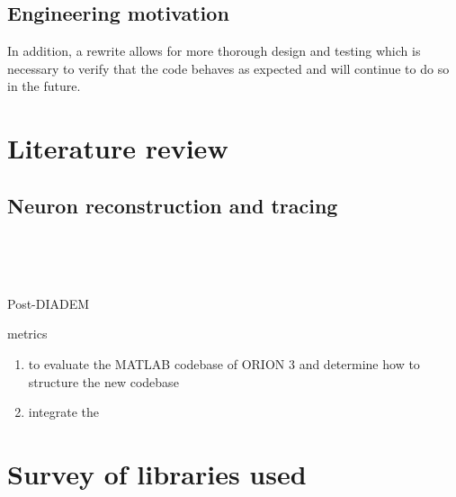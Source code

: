 \subsection{Engineering motivation}

In addition, a rewrite allows for more thorough
design and testing which is necessary to verify that the code
behaves as expected and will continue to do so in the future.

\section{Literature review}

\subsection{Neuron reconstruction and tracing}\label{subsec:neuron-tracing}

~\autocite{Duke-Southampton-archive:Cannon:1998,DIADEM-dataset:Brown:2011}

~\autocite{DIADEM&Beyond:Liu:2011,NeuroMorphTrends:Halavi:2012,NeuroTracePerspect:Meijering:2010}

Post-DIADEM
~\autocite{Bauer2010,MIA-anisotropic-path-searching-Xie2011,MICCAI-anisotropic-path-searching-Xie2010,
Jeong2015,Luo2015,De2015,Gulyanon2015,ORION_Santamaria-Pang2015,Mukherjee2014,Hernandez-Herrera2014,Basu2014,Xiao2013,Jimenez2013,Basu2013,Mukherjee2013,Hernandez-Herrera2013,Ming2013,Lee2012,Czarnecki2012}

metrics~\autocite{Mayerich2011,Mayerich2012,btmorph-Torben-Nielsen2014,Costa2014,Gillette2015}

\begin{enumerate}[label=(\roman*)]
\item to evaluate the MATLAB codebase of ORION 3 and determine how to structure the new codebase
\item integrate the
\end{enumerate}

%

\section{Survey of libraries used}


